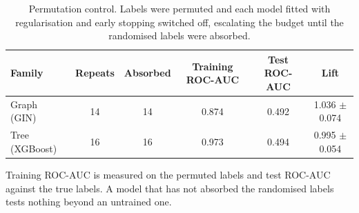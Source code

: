 \begin{table}[htbp]
\centering
\caption{Permutation control. Labels were permuted and each model fitted with regularisation and early stopping switched off, escalating the budget until the randomised labels were absorbed.}
\label{tab:si_permutation}
\footnotesize
\setlength{\tabcolsep}{4pt}
\begin{tabular}{lccccc}
\toprule
Family & Repeats & Absorbed & Training ROC-AUC & Test ROC-AUC & Lift \\
\midrule
Graph (GIN) & 14 & 14 & 0.874 & 0.492 & 1.036 $\pm$ 0.074 \\
Tree (XGBoost) & 16 & 16 & 0.973 & 0.494 & 0.995 $\pm$ 0.054 \\
\bottomrule
\end{tabular}
\begin{flushleft}\footnotesize Training ROC-AUC is measured on the permuted labels and test ROC-AUC against the true labels. A model that has not absorbed the randomised labels tests nothing beyond an untrained one.\end{flushleft}
\end{table}
